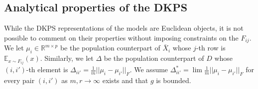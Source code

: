 
\subsection{Analytical properties of the DKPS}

While the DKPS representations of the models are Euclidean objects, it is not possible to comment on their properties without imposing constraints on the $ F_{ij} $.
We let $ \mu_i \in \mathbb{R}^{m \times p}$ be the population counterpart of $ \bar{X}_i $ whose $ j $-th row is $ \mathbb{E}_{x \sim F_{ij}}(x)$. 
Similarly, we let $ \Delta $ be the population counterpart of $ D $ whose $(i,i')$-th element is $ \Delta_{ii'} = \frac{1}{m}||\mu_{i} - \mu_{i'}||_{F} $.
We assume
 $ \Delta^{*}_{i i'} = \lim \frac{1}{m} || \mu_{i} - \mu_{i'}||_{F} $ for every pair $ (i,i') $ as $ m, r \to \infty $ exists
and that $ g $ is bounded.



